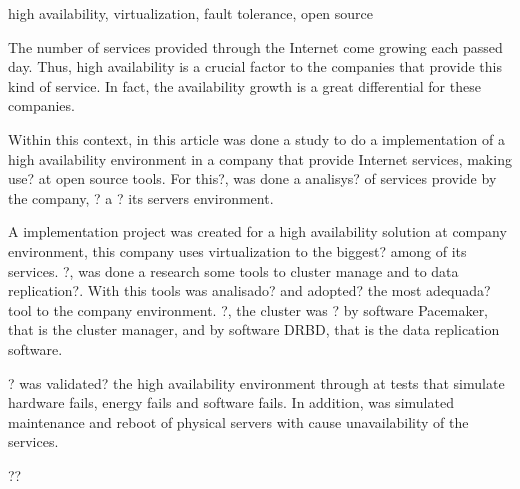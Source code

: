 \begin{englishabstract}{}{high availability, virtualization, fault tolerance, open source}

The number of services provided through the Internet come growing each passed day. Thus, high availability is a crucial factor to the 
companies that provide this kind of service. In fact, the availability growth is a great differential for these companies.

Within this context, in this article was done a study to do a implementation of a high availability environment in a company that provide 
Internet services, making use? at open source tools. For this?, was done a analisys? of services provide by the company, 
? a ? its servers environment.

A implementation project was created for a high availability solution at company environment, this company uses virtualization to the biggest?
among of its services. ?, was done a research some tools to cluster manage and to data replication?. With this tools was analisado? and adopted?
the most adequada? tool to the company environment. ?, the cluster was ? by software Pacemaker, that is the cluster manager, and by software
DRBD, that is the data replication software.

? was validated? the high availability environment through at tests that simulate hardware fails, energy fails and software fails. 
In addition, was simulated maintenance and reboot of physical servers with cause unavailability of the services.

??

\end{englishabstract}
